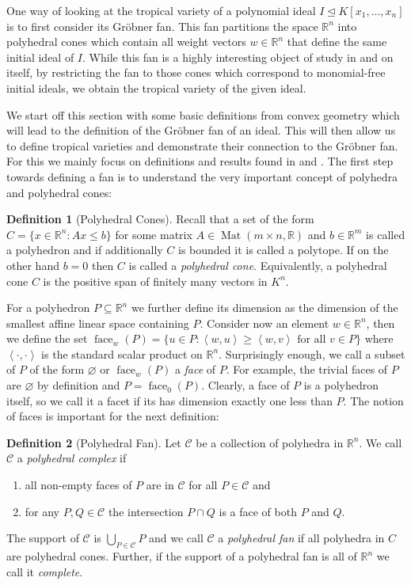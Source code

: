 \documentclass[
  paper=a4,
  DIV=14,
  fontsize=12pt,
  titlepage,
  bibliography=totoc,
  listof=totoc,
  pagesize=pdftex
]{scrartcl}
\numberwithin{figure}{section}
\numberwithin{equation}{section}
\numberwithin{table}{section}
\newcommand*\setR{\mathds{R}}
\newcommand*\ideal[1]{\left\langle #1 \right\rangle}
\let\idealof\trianglelefteq
\DeclareMathOperator{\Mat}{Mat}
\DeclareMathOperator{\face}{face}
\theoremstyle{definition}
\newtheorem{definition}{Definition}
\numberwithin{definition}{section}
\begin{document}
One way of looking at the tropical variety of a polynomial ideal $I \idealof K[x_1, \dots,
x_n]$ is to first consider its Gröbner fan. This fan partitions the space $\setR^n$ into
polyhedral cones which contain all weight vectors $w\in \setR^n$ that define the same
initial ideal of $I$. While this fan is a highly interesting object of study in and on
itself, by restricting the fan to those cones which correspond to monomial-free initial
ideals, we obtain the tropical variety of the given ideal.

We start off this section with some basic definitions from convex geometry which will lead
to the definition of the Gröbner fan of an ideal. This will then allow us to define
tropical varieties and demonstrate their connection to the Gröbner fan. For this we mainly
focus on definitions and results found in \cite{compGrobFan} and \cite{SturmGBCP}. The
first step towards defining a fan is to understand the very important concept of polyhedra
and polyhedral cones:

\begin{definition}[Polyhedral Cones]
  Recall that a set of the form $C = \{ x \in \setR^n : Ax \leq b \}$ for some matrix $A
  \in \Mat(m\times n, \setR)$ and $b \in \setR^m$ is called a polyhedron and if
  additionally $C$ is bounded it is called a polytope. If on the other hand $b=0$ then $C$
  is called a \emph{polyhedral cone}. Equivalently, a polyhedral cone $C$ is the positive
  span of finitely many vectors in $K^n$.
  \label{def:polyhedralCone}
\end{definition}

For a polyhedron $P \subseteq \setR^n$ we further define its dimension as the dimension of
the smallest affine linear space containing $P$. Consider now an element $w \in \setR^n$,
then we define the set $\face_w(P) = \{ u \in P : \ideal{w,u} \geq \ideal{w,v} \text{ for
all } v\in P\}$ where $\ideal{\cdot,\cdot}$ is the standard scalar product on $\setR^n$.
Surprisingly enough, we call a subset of $P$ of the form $\varnothing$ or $\face_w(P)$ a
\emph{face} of $P$. For example, the trivial faces of $P$ are $\varnothing$ by definition
and $P = \face_0(P)$. Clearly, a face of $P$ is a polyhedron itself, so we call it a facet
if its has dimension exactly one less than $P$. The notion of faces is important for the
next definition:

\begin{definition}[Polyhedral Fan]
  Let $\mathcal C$ be a collection of polyhedra in $\setR^n$. We call $\mathcal C$ a
  \emph{polyhedral complex} if
  \begin{enumerate}
    \item all non-empty faces of $P$ are in $\mathcal C$ for all $P \in \mathcal C$ and
    \item for any $P,Q \in \mathcal C$ the intersection $P\cap Q$ is a face of both $P$
      and $Q$.
  \end{enumerate}
  The support of $\mathcal C$ is $\bigcup_{P\in\mathcal C}P$ and we call $\mathcal C$ a
  \emph{polyhedral fan} if all polyhedra in $C$ are polyhedral cones. Further, if the
  support of a polyhedral fan is all of $\setR^n$ we call it \emph{complete}.
  \label{def:polyhedralFan}
\end{definition}
\end{document}
